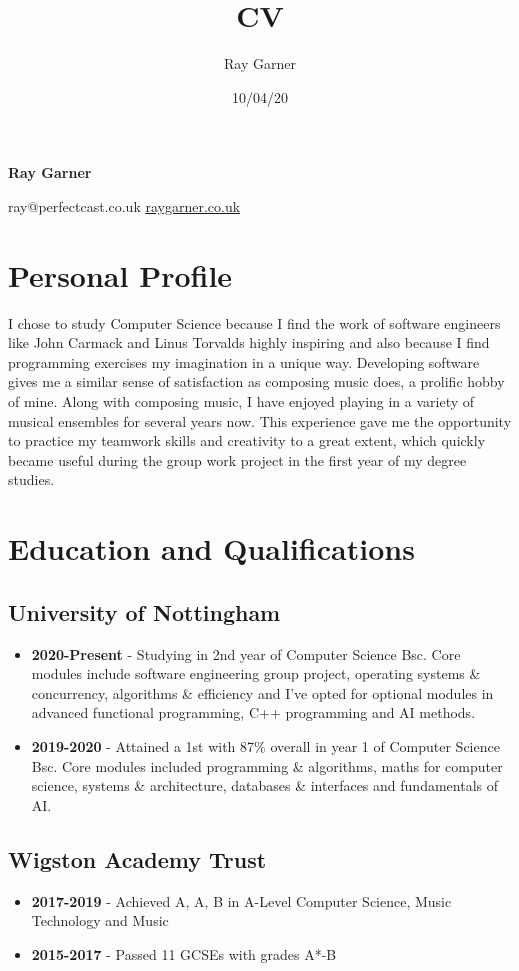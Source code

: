 \documentclass{article}
\title{CV}
\date{10/04/20}
\author{Ray Garner}
\makeatletter
\renewcommand{\maketitle}{
\begin{center}


{\huge\bfseries \vspace{-2cm} Ray Garner}
\vskip 0.25cm

{\large
ray@perfectcast.co.uk\hspace{0.5cm}
\href{https://www.raygarner.co.uk}{raygarner.co.uk}}

\vskip 0.25cm

\end{center}
}
\makeatother
\begin{document}
\maketitle
\section{Personal Profile}
I chose to study Computer Science because I find the work of software engineers like John Carmack and Linus Torvalds highly inspiring and also because I find programming exercises my imagination in a unique way.
Developing software gives me a similar sense of satisfaction as composing music does, a prolific hobby of mine.
Along with composing music, I have enjoyed playing in a variety of musical ensembles for several years now. 
This experience gave me the opportunity to practice my teamwork skills and creativity to a great extent, which quickly became useful during the group work project in the first year of my degree studies.



\section{Education and Qualifications}

\subsection{University of Nottingham}
\begin{itemize}[noitemsep]
\item \textbf{2020-Present} - Studying in 2nd year of Computer Science Bsc. Core modules include software engineering group project, operating systems \& concurrency, algorithms \& efficiency and I've opted for optional modules in advanced functional programming, C++ programming and AI methods. 
\item \textbf{2019-2020} - Attained a 1st with 87\% overall in year 1 of Computer Science Bsc. Core modules included programming \& algorithms, maths for computer science, systems \& architecture, databases \& interfaces and fundamentals of AI.


\end{itemize}



\subsection{Wigston Academy Trust}
\begin{itemize}[noitemsep]

\item \textbf{2017-2019} - Achieved A, A, B in A-Level Computer Science, Music Technology and Music
\item \textbf{2015-2017} - Passed 11 GCSEs with grades A*-B

\end{itemize}
\end{document}
